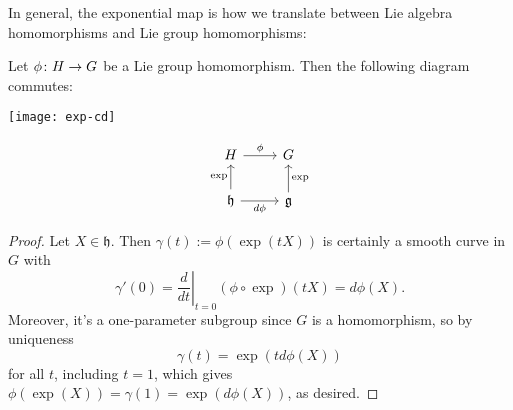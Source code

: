 In general, the exponential map is how we translate between Lie algebra homomorphisms and Lie group homomorphisms:

\begin{theorem}\label{thm:exp and homomorphisms}
	Let $\phi \colon\thinspace\! H \to G$ be a Lie group homomorphism. Then the following diagram commutes:
	\ifplastex
		\begin{center}
			\texttt{[image: exp-cd]}
		\end{center}
	\else	
		\[
			\begin{tikzcd}
				H  \arrow[r,"\phi"] & G \\
				\mathfrak{h} \arrow[u,"\exp"] \arrow[r,"d\phi"'] & \mathfrak{g} \arrow[u,"\exp"'] 
			\end{tikzcd}
		\]
	\fi
\end{theorem}

\begin{proof}
	Let $X \in \mathfrak{h}$. Then $\gamma(t) := \phi(\exp(tX))$ is certainly a smooth curve in $G$ with 
	\[
		\gamma'(0) = \left. \frac{d}{dt} \right|_{t=0} (\phi \circ \exp)(tX) = d\phi(X). 
	\]
	Moreover, it's a one-parameter subgroup since $G$ is a homomorphism, so by uniqueness
	\[
		\gamma(t) = \exp(t d\phi(X))
	\]
	for all $t$, including $t=1$, which gives $\phi(\exp(X)) = \gamma(1) = \exp(d\phi(X))$, as desired.
\end{proof}

